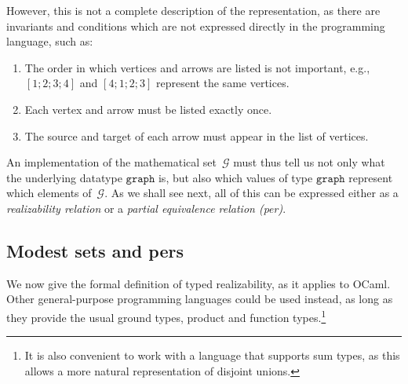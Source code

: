 %
However, this is not a complete description of the representation, as
there are invariants and conditions which are not expressed directly
in the programming language, such as:
%
\begin{enumerate}
\item The order in which vertices and arrows are listed is not
  important, e.g., $[1;2;3;4]$ and $[4;1;2;3]$ represent the same vertices.
\item Each vertex and arrow must be listed exactly once.
\item The source and target of each arrow must appear in the list of vertices.
%
\end{enumerate}


An implementation of the mathematical set~$\mathcal{G}$ must thus tell
us not only what the underlying datatype $\mathtt{graph}$ is, but also
which values of type $\mathtt{graph}$ represent which elements
of~$\mathcal{G}$. As we shall see next, all of this can be expressed
either as a \emph{realizability relation} or a \emph{partial
  equivalence relation (per)}.


\subsection{Modest sets and pers}
\label{sec:modest-sets-pers}

We now give the formal definition of typed realizability, as it
applies to OCaml. Other general-purpose programming languages could be
used instead, as long as they provide the usual ground types, product
and function types.\footnote{ It is also convenient to work with a
language that supports sum types, as this allows a more natural
representation of disjoint unions.}

